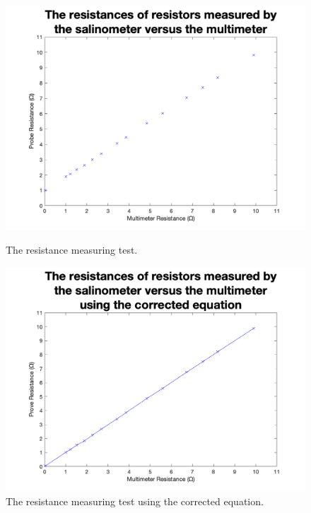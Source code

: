 \begin{figure}[!ht]
    \centering
    \begin{minipage}{.5\textwidth}
        \centering
        \includegraphics[width=\textwidth]{Figures/Testing/R_uncorrected}
        \caption{The resistance measuring test.}
        \label{fig:resistance-measuring-accuracy-uncorrected} %
    \end{minipage}%
    \begin{minipage}{.5\textwidth}
        \centering
        \includegraphics[width=\textwidth]{Figures/Testing/R_corrected}
        \caption{The resistance measuring test using the corrected equation.}
        \label{fig:resistance-measuring-accuracy-corrected} %
    \end{minipage}
\end{figure}

